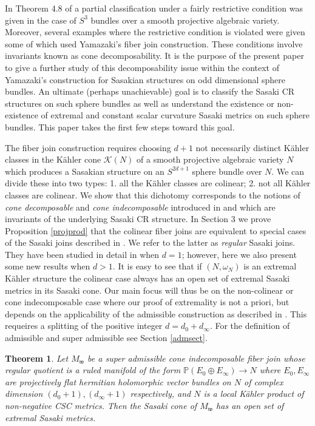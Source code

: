 \documentclass[12pt]{amsart}
\newtheorem{theorem}{Theorem}[section]
\def\bbp{{\mathbb P}}
\def\calk{{\mathcal K}}
\def\gw{{\mathfrak w}}
\begin{document}
In Theorem 4.8 of \cite{BHLT16} a partial classification under a fairly restrictive condition was given in the case of $S^3$ bundles over a smooth projective algebraic variety. Moreover, several examples where the restrictive condition is violated were given some of which used Yamazaki's fiber join construction. These conditions involve invariants known as cone decomposability. It is the purpose of the present paper to give a further study of this decomposability issue within the context of Yamazaki's construction for Sasakian structures on odd dimensional sphere bundles. An ultimate (perhaps unachievable) goal is to classify the Sasaki CR structures on such sphere bundles as well as understand the existence or non-existence of extremal and constant scalar curvature Sasaki metrics on such sphere bundles. This paper takes the first few steps toward this goal. 

The fiber join construction requires choosing $d+1$ not necessarily distinct K\"ahler classes in the K\"ahler cone $\calk(N)$ of a smooth projective algebraic variety $N$ which produces a Sasakian structure on an $S^{2d+1}$ sphere bundle over $N$. We can divide these into two types: 1. all the K\"ahler classes are colinear; 2. not all K\"ahler classes are colinear. We show that this dichotomy corresponds to the notions of {\it cone decomposable} and {\it cone indecomposable} introduced in \cite{BHLT16} and which are invariants of the underlying Sasaki CR structure. In Section 3 we prove Proposition \ref{projprod} that the colinear fiber joins are equivalent to special cases of the Sasaki joins described in \cite{BGO06}. We refer to the latter as {\it regular} Sasaki joins. They have been studied in detail in \cite{BoTo14a} when $d=1$; however, here we also present some new results when $d>1$. It is easy to see that if $(N,\omega_N)$ is an extremal K\"ahler structure the colinear case always has an open set of extremal Sasaki metrics in its Sasaki cone. Our main focus will thus be on the non-colinear or cone indecomposable case where our proof of extremality is not a priori, but depends on the applicability of the admissible construction as described in \cite{ACGT08}. This requeires a splitting of the positive integer $d=d_0+d_\infty$. For the definition of admissible and super admissible see Section \ref{admsect}.

\begin{theorem}\label{gennoncothm}
Let $M_\gw$ be a super admissible cone indecomposable fiber join whose regular quotient is a ruled manifold of the form $\bbp(E_0\oplus E_\infty)\longrightarrow N$ where $E_0 ,E_\infty$ are projectively flat hermitian holomorphic vector bundles on $N$ of complex dimension $(d_0+1),(d_\infty+1)$ respectively, and $N$ is a local K\"ahler product of non-negative CSC metrics. Then the Sasaki cone of $M_\gw$ has an open set of extremal Sasaki metrics.
\end{theorem}
\end{document}
